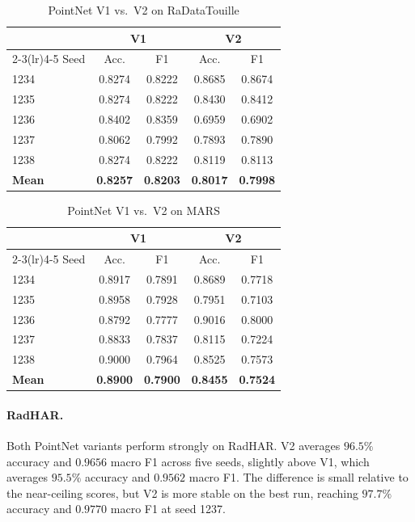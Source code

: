 \documentclass[10pt,twocolumn]{article}
\begin{document}
\begin{table}[H]
\centering
\scriptsize
\setlength{\tabcolsep}{3pt}
\begin{tabular}{lcccc}
\toprule
 & \multicolumn{2}{c}{V1} & \multicolumn{2}{c}{V2} \\
\cmidrule(lr){2-3}\cmidrule(lr){4-5}
Seed & Acc. & F1 & Acc. & F1 \\
\midrule
1234 & 0.8274 & 0.8222 & 0.8685 & 0.8674 \\
1235 & 0.8274 & 0.8222 & 0.8430 & 0.8412 \\
1236 & 0.8402 & 0.8359 & 0.6959 & 0.6902 \\
1237 & 0.8062 & 0.7992 & 0.7893 & 0.7890 \\
1238 & 0.8274 & 0.8222 & 0.8119 & 0.8113 \\
\midrule
\textbf{Mean} & \textbf{0.8257} & \textbf{0.8203} & \textbf{0.8017} & \textbf{0.7998} \\
\bottomrule
\end{tabular}
\caption{PointNet V1 vs.\ V2 on RaDataTouille}
\label{tab:pointnet-radatatouille}
\end{table}

\begin{table}[H]
\centering
\scriptsize
\setlength{\tabcolsep}{3pt}
\begin{tabular}{lcccc}
\toprule
 & \multicolumn{2}{c}{V1} & \multicolumn{2}{c}{V2} \\
\cmidrule(lr){2-3}\cmidrule(lr){4-5}
Seed & Acc. & F1 & Acc. & F1 \\
\midrule
1234 & 0.8917 & 0.7891 & 0.8689 & 0.7718 \\
1235 & 0.8958 & 0.7928 & 0.7951 & 0.7103 \\
1236 & 0.8792 & 0.7777 & 0.9016 & 0.8000 \\
1237 & 0.8833 & 0.7837 & 0.8115 & 0.7224 \\
1238 & 0.9000 & 0.7964 & 0.8525 & 0.7573 \\
\midrule
\textbf{Mean} & \textbf{0.8900} & \textbf{0.7900} & \textbf{0.8455} & \textbf{0.7524} \\
\bottomrule
\end{tabular}
\caption{PointNet V1 vs.\ V2 on MARS}
\label{tab:pointnet-mars}
\end{table}

\paragraph{RadHAR.}
Both PointNet variants perform strongly on RadHAR. V2 averages $96.5\%$
accuracy and $0.9656$ macro F1 across five seeds, slightly above V1, which
averages $95.5\%$ accuracy and $0.9562$ macro F1. The difference is small
relative to the near-ceiling scores, but V2 is more stable on the best run,
reaching $97.7\%$ accuracy and $0.9770$ macro F1 at seed 1237.
\end{document}
